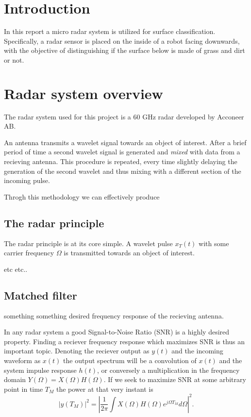 \documentclass[a4paper, 12pt]{article}
\begin{document}
\section{Introduction}

In this report a micro radar system is utilized for surface classification. Specifically, a radar sensor is placed on the inside of a robot facing downwards, with the objective of distinguishing if the surface below is made of grass and dirt or not.

\section{Radar system overview}

The radar system used for this project is a 60 GHz radar developed by Acconeer AB.

An antenna transmits a wavelet signal towards an object of interest. After a brief period of time a second wavelet signal is generated and \emph{mixed} with data from a recieving antenna. This procedure is repeated, every time slightly delaying the generation of the second wavelet and thus mixing with a different section of the incoming pulse. 

Throgh this methodology we can effectively produce

\subsection{The radar principle}

The radar principle is at its core simple.  A wavelet pulse $x_T(t)$ with some carrier frequency $\Omega$  is transmitted towards an object of interest. 

etc etc..


\subsection{Matched filter}

something something desired frequency response of the recieving antenna. 

In any radar system a good Signal-to-Noise Ratio (SNR) is a highly desired property. Finding a reciever frequency response which maximizes SNR is thus an important topic. Denoting the reciever output as $y(t)$ and the incoming waveform as $x(t)$ the output spectrum will be a convolution of $x(t)$ and the system impulse response $h(t)$, or conversely a multiplication in the frequency domain $Y(\Omega) = X(\Omega)H(\Omega)$. If we seek to maximize SNR at some arbitrary point in time $T_M$ the power at that very instant is
%
\begin{equation}
	|y(T_M)|^{2} = |\frac{1}{2\pi}\int X(\Omega)H(\Omega)e^{j\Omega T_M} d\Omega|^{2}.
\end{equation}
\end{document}
